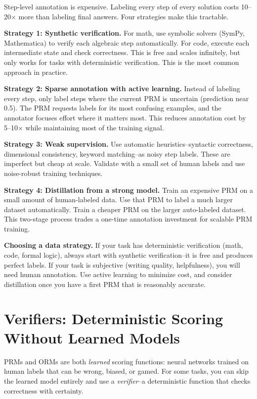 \begin{chapterenv}
Step-level annotation is expensive. Labeling every step of every solution costs 10--20$\times$ more than labeling final answers. Four strategies make this tractable.

\textbf{Strategy 1: Synthetic verification.} For math, use symbolic solvers (SymPy, Mathematica) to verify each algebraic step automatically. For code, execute each intermediate state and check correctness. This is free and scales infinitely, but only works for tasks with deterministic verification. This is the most common approach in practice.

\textbf{Strategy 2: Sparse annotation with active learning.} Instead of labeling every step, only label steps where the current PRM is uncertain (prediction near 0.5). The PRM requests labels for its most confusing examples, and the annotator focuses effort where it matters most. This reduces annotation cost by 5--10$\times$ while maintaining most of the training signal.

\textbf{Strategy 3: Weak supervision.} Use automatic heuristics--syntactic correctness, dimensional consistency, keyword matching--as noisy step labels. These are imperfect but cheap at scale. Validate with a small set of human labels and use noise-robust training techniques.

\textbf{Strategy 4: Distillation from a strong model.} Train an expensive PRM on a small amount of human-labeled data. Use that PRM to label a much larger dataset automatically. Train a cheaper PRM on the larger auto-labeled dataset. This two-stage process trades a one-time annotation investment for scalable PRM training.

\begin{tipbox}
\textbf{Choosing a data strategy.} If your task has deterministic verification (math, code, formal logic), always start with synthetic verification--it is free and produces perfect labels. If your task is subjective (writing quality, helpfulness), you will need human annotation. Use active learning to minimize cost, and consider distillation once you have a first PRM that is reasonably accurate.
\end{tipbox}

\section{Verifiers: Deterministic Scoring Without Learned Models}

PRMs and ORMs are both \textit{learned} scoring functions: neural networks trained on human labels that can be wrong, biased, or gamed. For some tasks, you can skip the learned model entirely and use a \textit{verifier}--a deterministic function that checks correctness with certainty.


\end{chapterenv}

